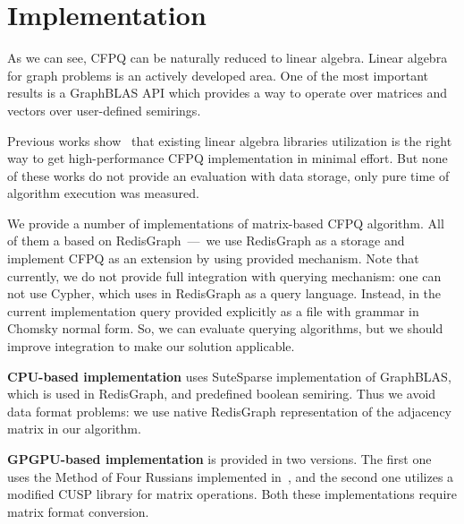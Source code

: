 \section{Implementation}

As we can see, CFPQ can be naturally reduced to linear algebra.
Linear algebra for graph problems is an actively developed area.
One of the most important results is a GraphBLAS API which provides a way to operate over matrices and vectors over user-defined semirings.

Previous works show~\cite{Mishin:2019:ECP:3327964.3328503, Azimov:2018:CPQ:3210259.3210264} that existing linear algebra libraries utilization is the right way to get high-performance CFPQ implementation in minimal effort.
But none of these works do not provide an evaluation with data storage, only pure time of algorithm execution was measured.

We provide a number of implementations of matrix-based CFPQ algorithm.
All of them a based on RedisGraph~---~we use RedisGraph as a storage and implement CFPQ as an extension by using provided mechanism.
Note that currently, we do not provide full integration with querying mechanism: one can not use Cypher, which uses in RedisGraph as a query language.
Instead, in the current implementation query provided explicitly as a file with grammar in Chomsky normal form.
So, we can evaluate querying algorithms, but we should improve integration to make our solution applicable.

\textbf{CPU-based implementation} uses SuteSparse implementation of GraphBLAS, which is used in RedisGraph, and predefined boolean semiring.
Thus we avoid data format problems: we use native RedisGraph representation of the adjacency matrix in our algorithm.

\textbf{GPGPU-based implementation} is provided in two versions.
The first one uses the Method of Four Russians implemented in~\cite{Mishin:2019:ECP:3327964.3328503}, and the second one utilizes a modified CUSP library for matrix operations.
Both these implementations require matrix format conversion.
